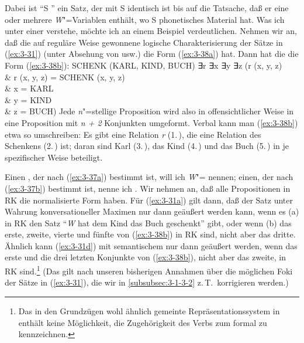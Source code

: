 \documentclass[output=paper]{langsci/langscibook}
\begin{document}
Dabei ist "`S "' ein Satz, der mit S identisch ist bis
auf die Tatsache, daß er eine oder mehrere \textit{W}"=Variablen enthält, wo
S phonetisches Material hat. Was ich unter einer
 verstehe, möchte
ich an einem Beispiel verdeutlichen. Nehmen wir an, daß die auf
reguläre Weise gewonnene logische Charakterisierung der Sätze in (\ref{ex:3-31})
(unter Absehung von  usw.) die Form (\ref{ex:3-38a}) hat. Dann hat die
 die Form (\ref{ex:3-38b}):
\eal \label{ex:3-38}
\ex
\label{ex:3-38a}
SCHENK (KARL, KIND, BUCH)
\ex
\label{ex:3-38b}
∃r ∃x ∃y ∃z (r (x, y, z) \\
\hspace{6em} \& r (x, y, z) = SCHENK (x, y, z) \\
\hspace{6em} \& x = KARL \\
\hspace{6em} \& y = KIND \\
\hspace{6em} \& z = BUCH)
\zl
Jede \textit{n}"=stellige Proposition wird also in offensichtlicher Weise in
eine Proposition mit \textit{n + 2} Konjunkten umgeformt. Verbal kann man
(\ref{ex:3-38b}) etwa so umschreiben: Es gibt eine Relation \textit{r} (1.\,),
die eine Relation des Schenkens (2.\,) ist; daran sind Karl
(3.\,), das Kind (4.\,) und das Buch (5.\,) in je
spezifischer Weise beteiligt.

Einen , der nach (\ref{ex:3-37a}) bestimmt ist, will ich \textit{W}"= nennen;
einen, der nach (\ref{ex:3-37b}) bestimmt ist, nenne ich . Wir nehmen an, daß alle Propositionen in RK die
normalisierte Form haben. Für (\ref{ex:3-31a}) gilt dann, daß der Satz unter
Wahrung konversationeller Maximen nur dann geäußert werden kann, wenn
es (a) in RK den Satz "`\textit{W} hat dem Kind das Buch geschenkt"' gibt, oder
wenn (b) das erste, zweite, vierte und fünfte  von (\ref{ex:3-38b}) in
RK sind, nicht aber das dritte. Ähnlich kann (\ref{ex:3-31d}) mit semantischem
 nur dann geäußert werden, wenn das erste und die drei letzten
Konjunkte von (\ref{ex:3-38b}), nicht aber das zweite, in RK sind.\footnote{\label{fn:3-11}%
  Das in den Grundzügen wohl ähnlich gemeinte Repräsentationssystem in \citet[542f]{Bartsch76}
  enthält keine Möglichkeit, die Zugehörigkeit des Verbs zum  formal zu kennzeichnen.%
}
(Das gilt nach unseren bisherigen Annahmen über die möglichen Foki der Sätze in (\ref{ex:3-31}), die
wir in \ref{subsubsec:3-1-3-2} z.\,T.\ korrigieren werden.)
\end{document}
